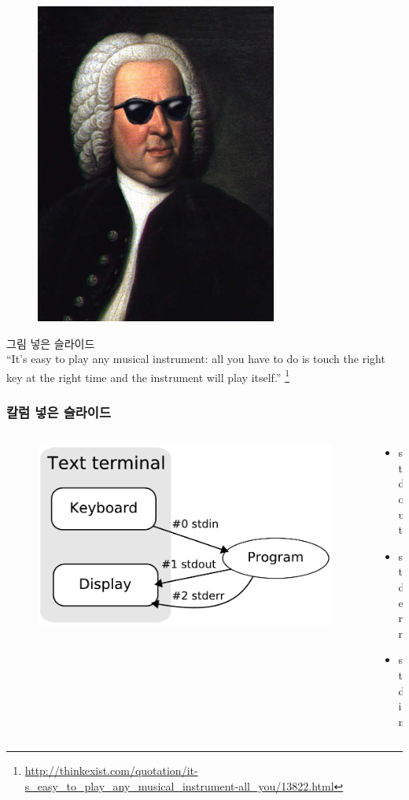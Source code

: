 \documentclass{beamer}
\begin{document}
\begin{frame}
	\begin{figure}
	\includegraphics[width=0.3\columnwidth]{jpg/bach_shades.jpg}
	\end{figure}
	그림 넣은 슬라이드 \\
	``It's easy to play any musical instrument: all you have to do is touch the right key at the right time and the instrument will play itself.''
	\footnote{\url{http://thinkexist.com/quotation/it-s_easy_to_play_any_musical_instrument-all_you/13822.html}}
\end{frame}

\begin{frame}
	\frametitle{칼럼 넣은 슬라이드}
	\begin{columns}
	\begin{column}{0.5\textwidth}
		\begin{figure}
		\includegraphics[width=0.9\columnwidth]{svg/Stdstreams-notitle}
		\end{figure}
	\end{column}

	\begin{column}{0.5\textwidth}
		\begin{itemize}
			\item stdout
			\item stderr
			\item stdin
		\end{itemize}
	\end{column}
	\end{columns}
\end{frame}
\end{document}
